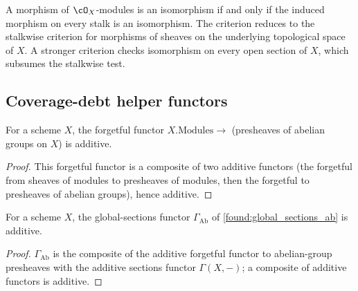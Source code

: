 \begin{lemma}
  \leanok
  \label{def:peer_module_iso_locality}
  A morphism of \(\cO_X\)-modules is an isomorphism if and only if the induced
  morphism on every stalk is an isomorphism.  The criterion reduces to the
  stalkwise criterion for morphisms of sheaves on the underlying topological
  space of \(X\).  A stronger criterion checks isomorphism on every open section
  of \(X\), which subsumes the stalkwise test.
\end{lemma}

\subsection{Coverage-debt helper functors}

\begin{lemma}
  \label{found:modules_topresheaf_additive}
  For a scheme \(X\), the forgetful functor \(X.\mathrm{Modules}\to\) (presheaves
  of abelian groups on \(X\)) is additive.
\end{lemma}

\begin{proof}
  \leanok
  This forgetful functor is a composite of two additive functors (the forgetful
  from sheaves of modules to presheaves of modules, then the forgetful to
  presheaves of abelian groups), hence additive.
\end{proof}

\begin{lemma}
  \label{found:global_sections_ab_additive}
  For a scheme \(X\), the global-sections functor
  \(\Gamma_{\mathrm{Ab}}\) of \cref{found:global_sections_ab} is additive.
\end{lemma}

\begin{proof}
  \leanok
  \(\Gamma_{\mathrm{Ab}}\) is the composite of the additive forgetful functor to
  abelian-group presheaves with the additive sections functor \(\Gamma(X,-)\); a
  composite of additive functors is additive.
\end{proof}

